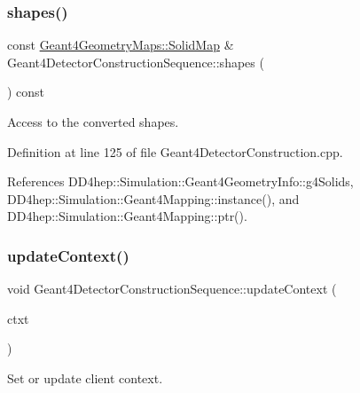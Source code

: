 \subsubsection{\texorpdfstring{shapes()}{shapes()}}
{\footnotesize\ttfamily const \hyperlink{namespace_d_d4hep_1_1_simulation_1_1_geant4_geometry_maps_a5591dbffcd2e6432004034209abd630e}{Geant4\+Geometry\+Maps\+::\+Solid\+Map} \& Geant4\+Detector\+Construction\+Sequence\+::shapes (\begin{DoxyParamCaption}{ }\end{DoxyParamCaption}) const}



Access to the converted shapes. 



Definition at line 125 of file Geant4\+Detector\+Construction.\+cpp.



References D\+D4hep\+::\+Simulation\+::\+Geant4\+Geometry\+Info\+::g4\+Solids, D\+D4hep\+::\+Simulation\+::\+Geant4\+Mapping\+::instance(), and D\+D4hep\+::\+Simulation\+::\+Geant4\+Mapping\+::ptr().

\hypertarget{class_d_d4hep_1_1_simulation_1_1_geant4_detector_construction_sequence_a2ccfc854d0b38a4b1547422c2779e346}{}\label{class_d_d4hep_1_1_simulation_1_1_geant4_detector_construction_sequence_a2ccfc854d0b38a4b1547422c2779e346} 
\subsubsection{\texorpdfstring{update\+Context()}{updateContext()}}
{\footnotesize\ttfamily void Geant4\+Detector\+Construction\+Sequence\+::update\+Context (\begin{DoxyParamCaption}\item[{\hyperlink{class_d_d4hep_1_1_simulation_1_1_geant4_context}{Geant4\+Context} $\ast$}]{ctxt }\end{DoxyParamCaption})\hspace{0.3cm}{\ttfamily [virtual]}}



Set or update client context. 



